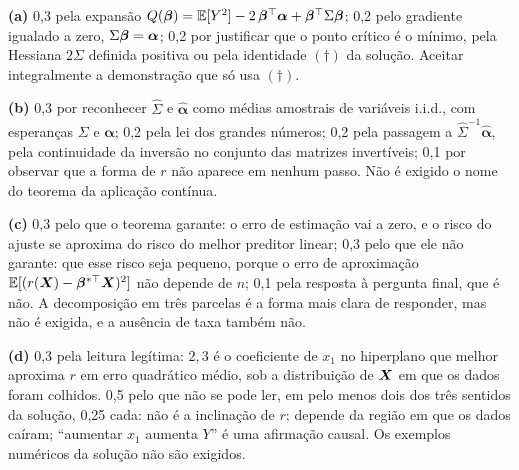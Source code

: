 \documentclass[11pt,a4paper]{article}
\begin{document}


\begin{criterio}
\textbf{(a)} 0,3 pela expansão
$Q(\bm{\beta})=\mathbb{E}[Y^2]-2\,\bm{\beta}^\top\bm\alpha+\bm{\beta}^\top\Sigma\bm{\beta}$; 0,2 pelo gradiente
igualado a zero, $\Sigma\bm{\beta}=\bm\alpha$; 0,2 por justificar que o ponto crítico é o
mínimo, pela Hessiana $2\Sigma$ definida positiva ou pela identidade $(\dagger)$ da
solução. Aceitar integralmente a demonstração que só usa $(\dagger)$.

\textbf{(b)} 0,3 por reconhecer $\widehat\Sigma$ e $\widehat{\bm\alpha}$ como médias
amostrais de variáveis i.i.d., com esperanças $\Sigma$ e $\bm\alpha$; 0,2 pela lei dos
grandes números; 0,2 pela passagem a $\widehat\Sigma^{-1}\widehat{\bm\alpha}$, pela
continuidade da inversão no conjunto das matrizes invertíveis; 0,1 por observar que a
forma de $r$ não aparece em nenhum passo. Não é exigido o nome do teorema da aplicação
contínua.

\textbf{(c)} 0,3 pelo que o teorema garante: o erro de estimação vai a zero, e o risco do
ajuste se aproxima do risco do melhor preditor linear; 0,3 pelo que ele não garante:
que esse risco seja pequeno, porque o erro de aproximação
$\mathbb{E}[(r(\bm{X})-\bm{\beta}^{\ast\top}\bm{X})^2]$ não depende de $n$; 0,1 pela resposta à pergunta
final, que é não. A decomposição em três parcelas é a forma mais clara de responder, mas
não é exigida, e a ausência de taxa também não.

\textbf{(d)} 0,3 pela leitura legítima: $2{,}3$ é o coeficiente de $x_1$ no hiperplano que
melhor aproxima $r$ em erro quadrático médio, sob a distribuição de $\bm{X}$ em que os dados
foram colhidos. 0,5 pelo que não se pode ler, em pelo menos dois dos três sentidos da
solução, 0,25 cada: não é a inclinação de $r$; depende da região em que os dados
caíram; ``aumentar $x_1$ aumenta $Y$'' é uma afirmação causal. Os exemplos numéricos da
solução não são exigidos.
\end{criterio}


\end{document}
